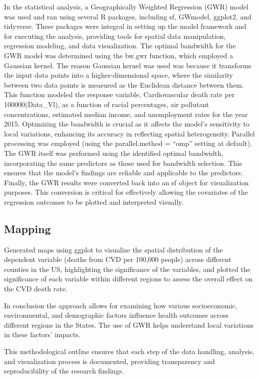 \documentclass[
]{article}
\begin{document}
In the statistical analysis, a Geographically Weighted Regression (GWR)
model was used and ran using several R packages, including sf, GWmodel,
ggplot2, and tidyverse. These packages were integral in setting up the
model framework and for executing the analysis, providing tools for
spatial data manipulation, regression modeling, and data visualization.
The optimal bandwidth for the GWR model was determined using the bw.gwr
function, which employed a Gaussian kernel. The reason Gaussian kernel
was used was because it transforms the input data points into a
higher-dimensional space, where the similarity between two data points
is measured as the Euclidean distance between them. This function
modeled the response variable, Cardiovascular death rate per
100000(Data\_Vl), as a function of racial percentages, air pollutant
concentrations, estimated median income, and unemployment rates for the
year 2015. Optimizing the bandwidth is crucial as it affects the model's
sensitivity to local variations, enhancing its accuracy in reflecting
spatial heterogeneity. Parallel processing was employed (using the
parallel.method = ``omp'' setting at default). The GWR itself was
performed using the identified optimal bandwidth, incorporating the same
predictors as those used for bandwidth selection. This ensures that the
model's findings are reliable and applicable to the predictors. Finally,
the GWR results were converted back into an sf object for visualization
purposes. This conversion is critical for effectively allowing the
covariates of the regression outcomes to be plotted and interpreted
visually.

\subsection{Mapping}\label{mapping}

Generated maps using ggplot to visualize the spatial distribution of the
dependent variable (deaths from CVD per 100,000 people) across different
counties in the US, highlighting the significance of the variables, and
plotted the significance of each variable within different regions to
assess the overall effect on the CVD death rate.

In conclusion the approach allows for examining how various
socioeconomic, environmental, and demographic factors influence health
outcomes across different regions in the States. The use of GWR helps
understand local variations in these factors' impacts.

This methodological outline ensures that each step of the data handling,
analysis, and visualization process is documented, providing
transparency and reproducibility of the research findings.
\end{document}
